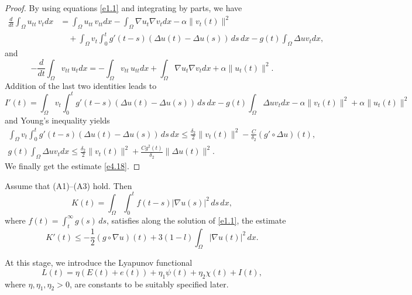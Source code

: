 \begin{proof}
By using equations \eqref{e1.1} and integrating by parts, we have
\begin{align*}
 \frac{d}{dt}\int_{\Omega} u_{tt} \, v_t dx
& =\int_{\Omega} u_{tt} \, v_{tt} dx -\int_{\Omega} \nabla u_t \nabla v_t dx
 - \alpha \| v_t (t) \|^2 \\
&\quad  +\int_{\Omega} v_t \int_0^t g'(t - s)(\Delta u(t) - \Delta u(s)) \, ds\,dx
- g(t) \int_{\Omega} \Delta u v_t dx,
\end{align*}
and
\begin{equation*}
- \frac{d}{dt}\int_{\Omega} v_{tt} \, u_t dx= -\int_{\Omega} v_{tt} \, u_{tt} dx
+\int_{\Omega} \nabla u_t \nabla v_t dx + \alpha \| u_t (t)\|^2.
\end{equation*}
Addition of the last two identities leads to
\[
I'(t)= \int_{\Omega} v_t \int_0^t g'(t - s)(\Delta u(t)
- \Delta u(s)) \, ds\,dx- g(t) \int_{\Omega} \Delta u v_t dx
 - \alpha \| v_t(t) \|^2 + \alpha \| u_t(t) \|^2
\]
and Young's inequality yields
\begin{gather*}
\int_{\Omega} v_t \int_0^t g'(t - s)(\Delta u(t) - \Delta u(s)) \, ds\,dx
\leq \frac{\delta_2}{2} \| v_t(t) \|^2- \frac{ C}{\delta_2}
(g' \circ \Delta u)(t),
\\
 g(t) \int_{\Omega} \Delta u v_t dx \leq \frac{\delta_2}{2} \| v_t(t) \|^2
 + \frac{Cg^2(t)}{ \delta_2} \| \Delta u (t) \|^2.
\end{gather*}
 We finally get the estimate \eqref{e4.18}.
\end{proof}

\begin{lemma} \label{lem10}
 Assume that {\rm (A1)--(A3)}  hold.
Then
\[
 K(t) = \int_{\Omega} \int_0^t f(t - s) |\nabla u(s)|^2 \, ds \, dx,
\]
where $f(t) = \int_{t}^{\infty} g(s) \, ds$, satisfies along the solution
of \eqref{e1.1}, the estimate
\begin{equation}
K'(t) \leq -\frac{1}{2} (g \circ \nabla u)(t)
+ 3(1 - l) \int_{\Omega} |\nabla u(t)|^2 \, dx.   \label{e4.19}
\end{equation}
\end{lemma}

At this stage, we introduce the Lyapunov functional
\begin{equation}
 L(t) = \eta( E(t)+ e(t) )+ \eta_1 \psi(t) + \eta_2 \chi(t)+ I(t), \label{e4.20}
\end{equation}
where $ \eta , \eta_1, \eta_2> 0$, are constants to be suitably specified later.

